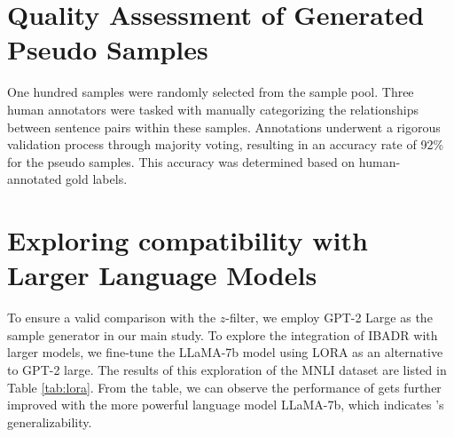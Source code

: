 \section{Quality Assessment of Generated Pseudo Samples}
One hundred samples were randomly selected from the sample pool. Three human annotators were tasked with manually categorizing the relationships between sentence pairs within these samples. Annotations underwent a rigorous validation process through majority voting, resulting in an accuracy rate of 92\% for the pseudo samples. This accuracy was determined based on human-annotated gold labels.

\section{Exploring \model compatibility with Larger Language Models}
\label{apdx:lora}
To ensure a valid comparison with the $z$-filter, we employ GPT-2 Large as the sample generator in our main study. To explore the integration of IBADR with larger models, we fine-tune the LLaMA-7b model \cite{llama} using LORA \cite{hu2021lora} as an alternative to GPT-2 large. The results of this exploration of the MNLI dataset are listed in Table \ref{tab:lora}. From the table, we can observe the performance of \model gets further improved with the more powerful language model LLaMA-7b, which indicates \model's generalizability. 

\begin{table}[th]
\centering
{}
\caption{Results of \model with GPT-2 and LLaMA-7b on MNLI.}
\label{tab:lora}
\end{table}